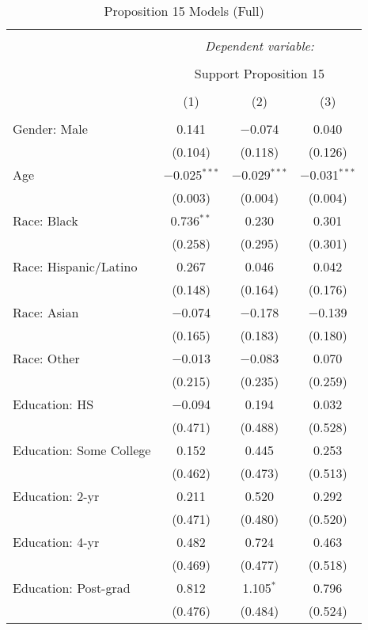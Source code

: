 
\begin{table}[!htbp] \centering 
  \caption{Proposition 15 Models (Full)} 
  \label{tab:reg_prop15_long} 
\footnotesize 
\begin{tabular}{@{\extracolsep{5pt}}lccc} 
\\[-1.8ex]\hline 
\hline \\[-1.8ex] 
 & \multicolumn{3}{c}{\textit{Dependent variable:}} \\ 
\cline{2-4} 
\\[-1.8ex] & \multicolumn{3}{c}{Support Proposition 15} \\ 
\\[-1.8ex] & (1) & (2) & (3)\\ 
\hline \\[-1.8ex] 
 Gender: Male & 0.141 & $-$0.074 & 0.040 \\ 
  & (0.104) & (0.118) & (0.126) \\ 
  Age & $-$0.025$^{***}$ & $-$0.029$^{***}$ & $-$0.031$^{***}$ \\ 
  & (0.003) & (0.004) & (0.004) \\ 
  Race: Black & 0.736$^{**}$ & 0.230 & 0.301 \\ 
  & (0.258) & (0.295) & (0.301) \\ 
  Race: Hispanic/Latino & 0.267 & 0.046 & 0.042 \\ 
  & (0.148) & (0.164) & (0.176) \\ 
  Race: Asian & $-$0.074 & $-$0.178 & $-$0.139 \\ 
  & (0.165) & (0.183) & (0.180) \\ 
  Race: Other & $-$0.013 & $-$0.083 & 0.070 \\ 
  & (0.215) & (0.235) & (0.259) \\ 
  Education: HS & $-$0.094 & 0.194 & 0.032 \\ 
  & (0.471) & (0.488) & (0.528) \\ 
  Education: Some College & 0.152 & 0.445 & 0.253 \\ 
  & (0.462) & (0.473) & (0.513) \\ 
  Education: 2-yr & 0.211 & 0.520 & 0.292 \\ 
  & (0.471) & (0.480) & (0.520) \\ 
  Education: 4-yr & 0.482 & 0.724 & 0.463 \\ 
  & (0.469) & (0.477) & (0.518) \\ 
  Education: Post-grad & 0.812 & 1.105$^{*}$ & 0.796 \\ 
  & (0.476) & (0.484) & (0.524) \\ 

\end{tabular}
\end{table}
